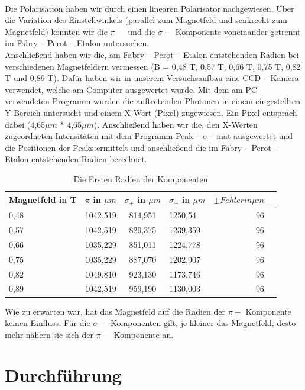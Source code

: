 \documentclass[10pt,a4paper]{article}
\begin{document}
\\
Die Polarisation haben wir durch einen linearen Polarisator nachgewiesen. Über die Variation des Einstellwinkels (parallel zum Magnetfeld und senkrecht zum Magnetfeld) konnten wir die $\pi - $  und die $\sigma  - $ Komponente voneinander getrennt im Fabry – Perot – Etalon untersuchen. 
\\
Anschließend haben wir die, am Fabry – Perot – Etalon entstehenden Radien bei verschiedenen Magnetfeldern vermessen (B = 0,48 T, 0,57 T,  0,66 T,  0,75 T, 0,82 T und 0,89 T). Dafür haben wir in unserem Versuchsaufbau eine CCD – Kamera verwendet, welche am Computer ausgewertet wurde. Mit dem am PC verwendeten Programm wurden die auftretenden Photonen in einem eingestellten Y-Bereich untersucht und einem X-Wert (Pixel) zugewiesen. Ein Pixel entsprach dabei (4,65$\mu m$  * 4,65$\mu m$). Anschließend haben wir die, den X-Werten zugeordneten Intensitäten mit dem Programm Peak – o – mat ausgewertet und die Positionen der Peaks ermittelt und anschließend die im Fabry – Perot – Etalon entstehenden Radien berechnet.

\begin{table}[h!]
	\centering
	\begin{tabular}{|l|r|c|lrp{16cm}}\hline
		Magnetfeld in T & $\pi $ in $\mu m$  & $\sigma_{+}$ in $\mu m$ & $\sigma_{+}$ in $\mu m$ & $\pm Fehler in $$\mu m $\\\hline
		0,48 & 1042,519 & 814,951 & 1250,54 & 96	\\
		0,57 & 1042,519 & 829,375 &1239,359 & 96	\\
		0,66 & 1035,229 & 851,011 &1224,778 & 96	\\
		0,75 & 1035,229 & 887,070 &1202,907 & 96    \\
		0,82 & 1049,810 & 923,130 &1173,746 & 96	\\
		0,89 & 1042,519 & 959,190 &1130,003 & 96    \\\hline		
	\end{tabular}
	\caption{Die Ersten Radien der Komponenten}
	\label{spektrum2}
\end{table}


Wie zu erwarten war, hat das Magnetfeld auf die Radien der $\pi - $ Komponente keinen Einfluss. Für die $\sigma - $ Komponenten gilt, je kleiner das Magnetfeld, desto mehr nähern sie sich der $\pi - $ Komponente an.

\section{Durchführung}
\end{document}
